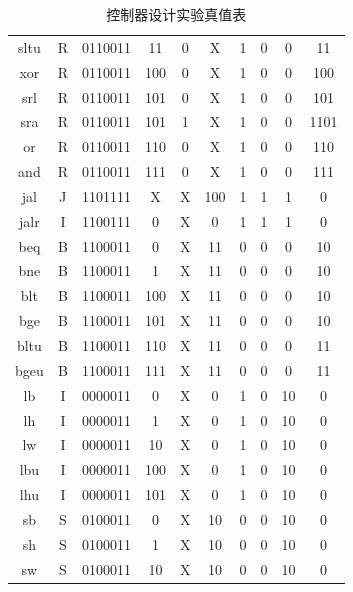 \documentclass[12pt, a4paper]{ctexart}
\begin{document}
\begin{table}[H]
\begin{tabular}{cccccccccc}
        sltu & R & 0110011 & 11 & 0 & X & 1 & 0 & 0 & 11 \\
        xor & R & 0110011 & 100 & 0 & X & 1 & 0 & 0 & 100 \\
        srl & R & 0110011 & 101 & 0 & X & 1 & 0 & 0 & 101 \\
        sra & R & 0110011 & 101 & 1 & X & 1 & 0 & 0 & 1101 \\
        or & R & 0110011 & 110 & 0 & X & 1 & 0 & 0 & 110 \\
        and & R & 0110011 & 111 & 0 & X & 1 & 0 & 0 & 111 \\
        jal & J & 1101111 & X & X & 100 & 1 & 1 & 1 & 0 \\
        jalr & I & 1100111 & 0 & X & 0 & 1 & 1 & 1 & 0 \\
        beq & B & 1100011 & 0 & X & 11 & 0 & 0 & 0 & 10 \\
        bne & B & 1100011 & 1 & X & 11 & 0 & 0 & 0 & 10 \\
        blt & B & 1100011 & 100 & X & 11 & 0 & 0 & 0 & 10 \\
        bge & B & 1100011 & 101 & X & 11 & 0 & 0 & 0 & 10 \\
        bltu & B & 1100011 & 110 & X & 11 & 0 & 0 & 0 & 11 \\
        bgeu & B & 1100011 & 111 & X & 11 & 0 & 0 & 0 & 11 \\
        lb & I & 0000011 & 0 & X & 0 & 1 & 0 & 10 & 0 \\
        lh & I & 0000011 & 1 & X & 0 & 1 & 0 & 10 & 0 \\
        lw & I & 0000011 & 10 & X & 0 & 1 & 0 & 10 & 0 \\
        lbu & I & 0000011 & 100 & X & 0 & 1 & 0 & 10 & 0 \\
        lhu & I & 0000011 & 101 & X & 0 & 1 & 0 & 10 & 0 \\
        sb & S & 0100011 & 0 & X & 10 & 0 & 0 & 10 & 0 \\
        sh & S & 0100011 & 1 & X & 10 & 0 & 0 & 10 & 0 \\
        sw & S & 0100011 & 10 & X & 10 & 0 & 0 & 10 & 0 \\
        \hline
    \end{tabular}
    \caption{控制器设计实验真值表}
\end{table}
\end{document}
